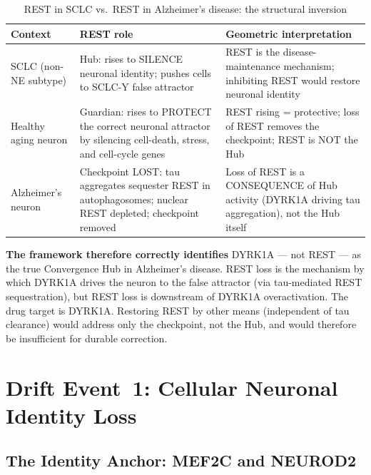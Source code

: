 \documentclass[12pt,a4paper]{article}
\begin{document}
\begin{table}[ht!]
\centering
\caption{REST in SCLC vs.\ REST in Alzheimer's disease:
  the structural inversion}
\label{tab:rest_inversion}
\begin{tabular}{p{3.0cm}p{4.5cm}p{4.5cm}}
\toprule
\textbf{Context} &
\textbf{REST role} &
\textbf{Geometric interpretation} \\
\midrule
SCLC (non-NE subtype) &
Hub: rises to SILENCE neuronal identity;
pushes cells to SCLC-Y false attractor &
REST is the disease-maintenance mechanism;
inhibiting REST would restore
neuronal identity \\[6pt]
Healthy aging neuron &
Guardian: rises to PROTECT the correct
neuronal attractor by silencing cell-death,
stress, and cell-cycle genes &
REST rising = protective; loss of REST
removes the checkpoint; REST is NOT the Hub \\[6pt]
Alzheimer's neuron &
Checkpoint LOST: tau aggregates sequester
REST in autophagosomes; nuclear REST
depleted; checkpoint removed &
Loss of REST is a CONSEQUENCE of Hub
activity (DYRK1A driving tau
aggregation), not the Hub itself \\
\bottomrule
\end{tabular}
\end{table}

\noindent\textbf{The framework therefore correctly
identifies} DYRK1A --- not REST --- as the true
Convergence Hub in Alzheimer's disease. REST loss is
the mechanism by which DYRK1A drives the neuron to
the false attractor (via tau-mediated REST sequestration),
but REST loss is downstream of DYRK1A overactivation.
The drug target is DYRK1A. Restoring REST by other means
(independent of tau clearance) would address only the
checkpoint, not the Hub, and would therefore be
insufficient for durable correction.

\section{Drift Event~1: Cellular Neuronal Identity Loss}

\subsection{The Identity Anchor: MEF2C and NEUROD2}
\end{document}
